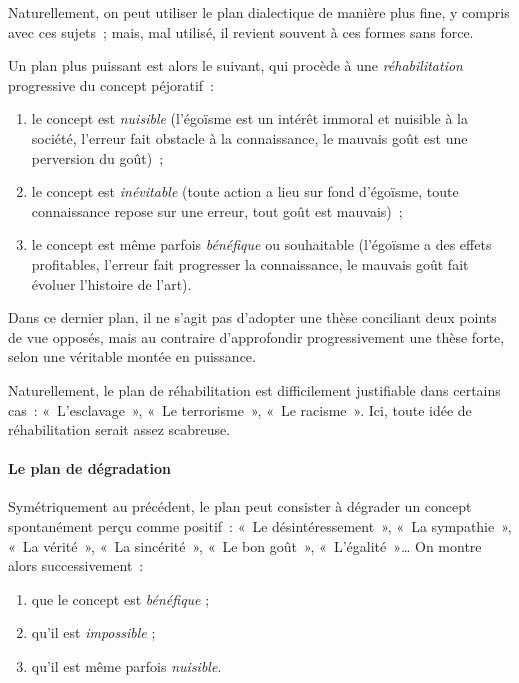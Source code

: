 \documentclass[a4paper,12pt]{article}
\begin{document}
Naturellement, on peut utiliser le plan dialectique de manière plus
fine, y compris avec ces sujets ; mais, mal utilisé, il revient souvent
à ces formes sans force.

Un plan plus puissant est alors le suivant, qui procède à une
\emph{réhabilitation} progressive du concept péjoratif :

\begin{enumerate}
\item le concept est \emph{nuisible} (l'égoïsme est un intérêt immoral et
nuisible à la société, l'erreur fait obstacle à la connaissance, le
mauvais goût est une perversion du goût) ;

\item le concept est \emph{inévitable} (toute action a lieu sur fond d'égoïsme,
toute connaissance repose sur une erreur, tout goût est mauvais) ;

\item le concept est même parfois \emph{bénéfique} ou souhaitable (l'égoïsme a
des effets profitables, l'erreur fait progresser la connaissance, le
mauvais goût fait évoluer l'histoire de l'art).
\end{enumerate}

Dans ce dernier plan, il ne s'agit pas d'adopter une thèse conciliant
deux points de vue opposés, mais au contraire d'approfondir
progressivement une thèse forte, selon une véritable montée en
puissance.

Naturellement, le plan de réhabilitation est difficilement justifiable
dans certains cas : « L'esclavage », « Le terrorisme », « Le racisme ». Ici,
toute idée de réhabilitation serait assez scabreuse.

\paragraph{Le plan de dégradation}
\label{sec-3-1-4-5}

Symétriquement au précédent, le plan peut consister à dégrader un
concept spontanément perçu comme positif : « Le désintéressement », « La
sympathie », « La vérité », « La sincérité », « Le bon goût », « L'égalité »\ldots{}
On montre alors successivement :

\begin{enumerate}
\item que le concept est \emph{bénéfique} ;

\item qu'il est \emph{impossible} ;

\item qu'il est même parfois \emph{nuisible}.
\end{enumerate}
\end{document}
